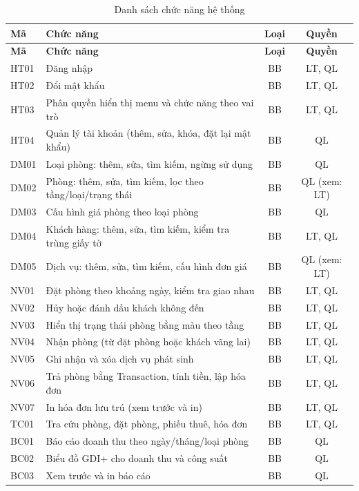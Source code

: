 \documentclass[14pt]{report}
\begin{document}
\begin{longtable}{|l|p{6.8cm}|c|c|}
\caption{Danh sách chức năng hệ thống}\label{tab:chuc-nang-chi-tiet}\\
\hline
\textbf{Mã} & \textbf{Chức năng} & \textbf{Loại} & \textbf{Quyền}\\\hline
\endfirsthead
\hline \textbf{Mã} & \textbf{Chức năng} & \textbf{Loại} & \textbf{Quyền}\\\hline
\endhead
HT01 & Đăng nhập & BB & LT, QL \\\hline
HT02 & Đổi mật khẩu & BB & LT, QL \\\hline
HT03 & Phân quyền hiển thị menu và chức năng theo vai trò & BB & LT, QL \\\hline
HT04 & Quản lý tài khoản (thêm, sửa, khóa, đặt lại mật khẩu) & BB & QL \\\hline
DM01 & Loại phòng: thêm, sửa, tìm kiếm, ngừng sử dụng & BB & QL \\\hline
DM02 & Phòng: thêm, sửa, tìm kiếm, lọc theo tầng/loại/trạng thái & BB & QL (xem: LT) \\\hline
DM03 & Cấu hình giá phòng theo loại phòng & BB & QL \\\hline
DM04 & Khách hàng: thêm, sửa, tìm kiếm, kiểm tra trùng giấy tờ & BB & LT, QL \\\hline
DM05 & Dịch vụ: thêm, sửa, tìm kiếm, cấu hình đơn giá & BB & QL (xem: LT) \\\hline
NV01 & Đặt phòng theo khoảng ngày, kiểm tra giao nhau & BB & LT, QL \\\hline
NV02 & Hủy hoặc đánh dấu khách không đến & BB & LT, QL \\\hline
NV03 & Hiển thị trạng thái phòng bằng màu theo tầng & BB & LT, QL \\\hline
NV04 & Nhận phòng (từ đặt phòng hoặc khách vãng lai) & BB & LT, QL \\\hline
NV05 & Ghi nhận và xóa dịch vụ phát sinh & BB & LT, QL \\\hline
NV06 & Trả phòng bằng Transaction, tính tiền, lập hóa đơn & BB & LT, QL \\\hline
NV07 & In hóa đơn lưu trú (xem trước và in) & BB & LT, QL \\\hline
TC01 & Tra cứu phòng, đặt phòng, phiếu thuê, hóa đơn & BB & LT, QL \\\hline
BC01 & Báo cáo doanh thu theo ngày/tháng/loại phòng & BB & QL \\\hline
BC02 & Biểu đồ GDI+ cho doanh thu và công suất & BB & QL \\\hline
BC03 & Xem trước và in báo cáo & BB & QL \\\hline

\end{longtable}
\end{document}
